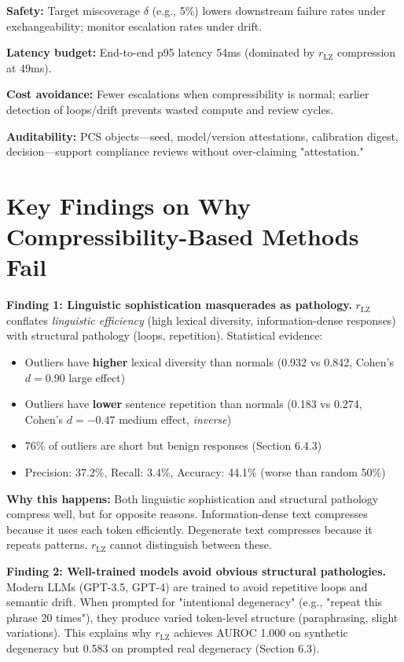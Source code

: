 \documentclass[11pt]{article}
\begin{document}
\textbf{Safety:} Target miscoverage $\delta$ (e.g., 5\%) lowers downstream failure rates under exchangeability; monitor escalation rates under drift.

\textbf{Latency budget:} End-to-end p95 latency 54ms (dominated by $r_{\text{LZ}}$ compression at 49ms).

\textbf{Cost avoidance:} Fewer escalations when compressibility is normal; earlier detection of loops/drift prevents wasted compute and review cycles.

\textbf{Auditability:} PCS objects---seed, model/version attestations, calibration digest, decision---support compliance reviews without over-claiming "attestation."

\section{Key Findings on Why Compressibility-Based Methods Fail}
\label{sec:limitations}

\textbf{Finding 1: Linguistic sophistication masquerades as pathology.} $r_{\text{LZ}}$ conflates \textit{linguistic efficiency} (high lexical diversity, information-dense responses) with structural pathology (loops, repetition). Statistical evidence:
\begin{itemize}
\item Outliers have \textbf{higher} lexical diversity than normals (0.932 vs 0.842, Cohen's $d=0.90$ large effect)
\item Outliers have \textbf{lower} sentence repetition than normals (0.183 vs 0.274, Cohen's $d=-0.47$ medium effect, \textit{inverse})
\item 76\% of outliers are short but benign responses (Section 6.4.3)
\item Precision: 37.2\%, Recall: 3.4\%, Accuracy: 44.1\% (worse than random 50\%)
\end{itemize}

\textbf{Why this happens:} Both linguistic sophistication and structural pathology compress well, but for opposite reasons. Information-dense text compresses because it uses each token efficiently. Degenerate text compresses because it repeats patterns. $r_{\text{LZ}}$ cannot distinguish between these.

\textbf{Finding 2: Well-trained models avoid obvious structural pathologies.} Modern LLMs (GPT-3.5, GPT-4) are trained to avoid repetitive loops and semantic drift. When prompted for "intentional degeneracy" (e.g., "repeat this phrase 20 times"), they produce varied token-level structure (paraphrasing, slight variations). This explains why $r_{\text{LZ}}$ achieves AUROC 1.000 on synthetic degeneracy but 0.583 on prompted real degeneracy (Section 6.3).
\end{document}
